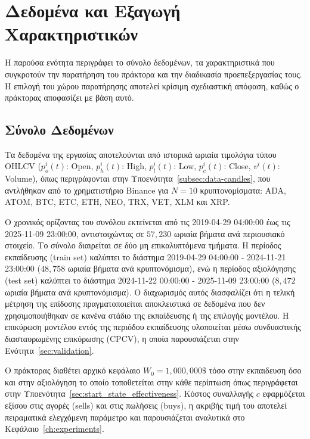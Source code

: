 \section{Δεδομένα και Εξαγωγή Χαρακτηριστικών}
\label{sec:data}

Η παρούσα ενότητα περιγράφει το σύνολο δεδομένων, τα χαρακτηριστικά που
συγκροτούν την παρατήρηση του πράκτορα και την διαδικασία προεπεξεργασίας τους. Η
επιλογή του χώρου παρατήρησης αποτελεί κρίσιμη σχεδιαστική απόφαση, καθώς ο
πράκτορας αποφασίζει με βάση αυτό.

\subsection{Σύνολο Δεδομένων}
\label{sec:dataset}

Τα δεδομένα της εργασίας αποτελούνται από ιστορικά ωριαία τιμολόγια τύπου
OHLCV ($p^i_o(t)$: Open, $p^i_h(t)$: High, $p^i_l(t)$: Low, $p^i_c(t)$: Close, $v^i(t)$: Volume), 
όπως περιγράφονται στην Υποενότητα~\ref{subsec:data-candles}, 
που αντλήθηκαν από το χρηματιστήριο Binance για $N = 10$ κρυπτονομίσματα: ADA, ATOM, BTC, ETC, ETH,
NEO, TRX, VET, XLM και XRP.

Ο χρονικός ορίζοντας του συνόλου εκτείνεται από τις 2019-04-29 04:00:00 
έως τις 2025-11-09 23:00:00, αντιστοιχώντας σε 
$57{,}230$ ωριαία βήματα ανά περιουσιακό στοιχείο. 
Το σύνολο διαιρείται σε δύο μη επικαλυπτόμενα τμήματα. Η περίοδος
εκπαίδευσης (train set) καλύπτει το διάστημα 2019-04-29 04:00:00 - 2024-11-21 23:00:00 
($48{,}758$ ωριαία βήματα ανά κρυπτονόμισμα), ενώ η περίοδος
αξιολόγησης (test set) καλύπτει το διάστημα 2024-11-22 00:00:00 - 2025-11-09 23:00:00 
($8{,}472$ ωριαία βήματα ανά κρυπτονόμισμα). Ο διαχωρισμός αυτός διασφαλίζει ότι η τελική
μέτρηση της επίδοσης πραγματοποιείται αποκλειστικά σε δεδομένα που δεν
χρησιμοποιήθηκαν σε κανένα στάδιο της εκπαίδευσης ή της επιλογής μοντέλου. Η
επικύρωση μοντέλου εντός της περιόδου εκπαίδευσης υλοποιείται μέσω
συνδυαστικής διασταυρωμένης επικύρωσης (CPCV), η οποία
παρουσιάζεται στην Ενότητα~\ref{sec:validation}.

Ο πράκτορας διαθέτει αρχικό κεφάλαιο $W_0 = 1{,}000{,}000\$$ τόσο στην εκπαιδευση
όσο και στην αξιολόγηση το οποίο τοποθετείται στην κάθε περίπτωση όπως περιγράφεται στην Υποενότητα~\ref{sec:start_state_effectiveness}. 
Κόστος συναλλαγής $c$ εφαρμόζεται εξίσου στις αγορές (sells) και στις
πωλήσεις (buys), η ακριβής τιμή του αποτελεί πειραματικά ελεγχόμενη παράμετρο και
παρουσιάζεται αναλυτικά στο Κεφάλαιο~\ref{ch:experiments}.

